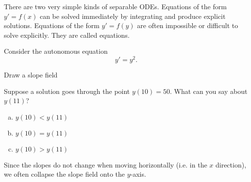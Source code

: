 \begin{applicationActivities}

\begin{observation}
There are two very simple kinds of separable ODEs.
\vfill
Equations of the form \(y'=f(x)\) can be solved immediately by integrating and produce explicit solutions.
\vfill
Equations of the form \(y'=f(y)\) are often impossible or difficult to solve explicitly.  They are called  equations.
\end{observation}

\begin{activity}{10}
Consider the autonomous equation \[y'=y^2.\]
\vfill
\begin{subactivity}
Draw a slope field
\end{subactivity}
\begin{subactivity}
Suppose a solution goes through the point \(y(10)=50 \).  What can you say about \(y(11)\)?
\vfill
\begin{enumerate}[(a)]
\item \(y(10)<y(11)\)
\item \(y(10)=y(11)\)
\item \(y(10)>y(11)\)
\end{enumerate}
\end{subactivity}
\end{activity}

\begin{observation}
Since the slopes do not change when moving horizontally (i.e. in the \(x\) direction), we often collapse the slope field onto the \(y\)-axis.

\begin{multicols}{2}
\begin{center}


\end{center}
\end{multicols}
\end{observation}
\end{applicationActivities}
